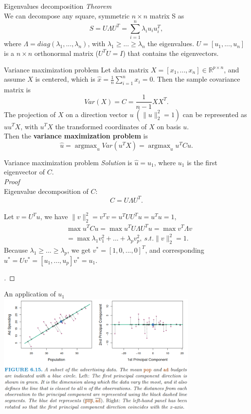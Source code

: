 \documentclass{beamer}
\begin{document}
	\begin{frame}{Eigenvalues decomposition}
		\textit{Theorem}\\
		We can decompose any square, symmetric $n\times n$ matrix S as
		\[
		S=U\Lambda U^T=\sum_{i=1}^{n}\lambda_iu_iu_i^T,
		\]
		where $\Lambda=diag(\lambda_1,...,\lambda_n)$, with $\lambda_1\geq...\geq\lambda_n$ the eigenvalues. $U=[u_1,...,u_n]$ is a $n \times n$ orthonormal matrix ($U^TU=I$) that contains the eigenvectors.
	\end{frame}
	
	\begin{frame}{Variance maximization problem}
		Let data matrix $X=[x_1,...,x_n]\in \mathbb{R}^{p\times n}$, and assume $X$ is centered, which is $\hat{x}=\frac{1}{n}\sum_{i=1}^{n}x_i=0$. Then the sample covariance matrix is
		\[
		Var(X)=C=\frac{1}{n-1}XX^T.
		\]
		The projection of $X$ on a direction vector $u\ (\|u\|_2^2=1)$ can be represented as $uu^TX$, with $u^TX$ the transformed coordinates of $X$ on basis $u$. \\
		Then the \textbf{variance maximization problem} is
		\[
		\hat{u}=\mathop{\arg\max}_{u} Var(u^TX)=\mathop{\arg\max}_{u} u^TCu.
		\]
	\end{frame}
	
	\begin{frame}{Variance maximization problem}
		\textit{Solution} is $\hat{u}=u_1$, where $u_1$ is the first eigenvector of $C$.\\
		\vspace{0.5cm}
		\textit{Proof} \\
		Eigenvalue decomposition of $C$: 
		\[
		C=U\Lambda U^T.
		\] \\
		Let $v=U^Tu$, we have $\|v\|_2^2=v^Tv=u^TUU^Tu=u^Tu=1$,
		\begin{align*}
			&\max u^TCu = \max u^TU\Lambda U^Tu = \max v^T\Lambda v \\
			&=\max \lambda_1v_1^2 + ... + \lambda_pv_p^2,\ s.t. \|v\|_2^2=1.
		\end{align*}
		Because $\lambda_1 \geq...\geq\lambda_p$, we get $v^*=[1,0,...,0]^T$, and corresponding $u^*=Uv^*=[u_1,...,u_p]v^*=u_1$.
		\begin{proof}[\unskip\nopunct]\end{proof}
	\end{frame}
	
	\begin{frame}{An application of $u_1$}
		\includegraphics[width=10cm]{figure_6.15.png}
	\end{frame}
	
\end{document}
